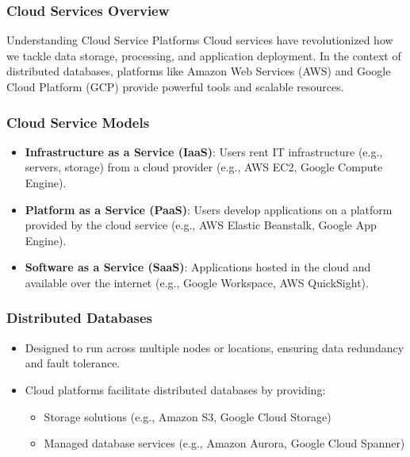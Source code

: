 \documentclass[aspectratio=169]{beamer}
\begin{document}
\begin{frame}[fragile]
  \frametitle{Cloud Services Overview}
  
  \begin{block}{Understanding Cloud Service Platforms}
    Cloud services have revolutionized how we tackle data storage, processing, and application deployment. 
    In the context of distributed databases, platforms like Amazon Web Services (AWS) and Google Cloud Platform (GCP) provide powerful tools and scalable resources.
  \end{block}
\end{frame}

\begin{frame}[fragile]
  \frametitle{Cloud Service Models}
  
  \begin{itemize}
    \item \textbf{Infrastructure as a Service (IaaS)}: Users rent IT infrastructure (e.g., servers, storage) from a cloud provider (e.g., AWS EC2, Google Compute Engine).
    \item \textbf{Platform as a Service (PaaS)}: Users develop applications on a platform provided by the cloud service (e.g., AWS Elastic Beanstalk, Google App Engine).
    \item \textbf{Software as a Service (SaaS)}: Applications hosted in the cloud and available over the internet (e.g., Google Workspace, AWS QuickSight).
  \end{itemize}
\end{frame}

\begin{frame}[fragile]
  \frametitle{Distributed Databases}
  
  \begin{itemize}
    \item Designed to run across multiple nodes or locations, ensuring data redundancy and fault tolerance.
    \item Cloud platforms facilitate distributed databases by providing:
      \begin{itemize}
        \item Storage solutions (e.g., Amazon S3, Google Cloud Storage)
        \item Managed database services (e.g., Amazon Aurora, Google Cloud Spanner)
      \end{itemize}
  \end{itemize}
\end{frame}
\end{document}
